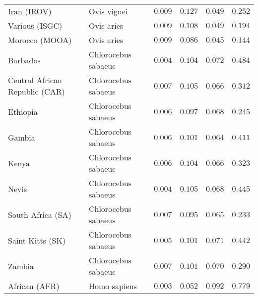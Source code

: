 \documentclass{article}
\begin{document}
\begin{center}
\begin{longtable}{|l|l|r|r|r|r|}
            Iran (IROV)                    & Ovis vignei         & $ 0.009$              & $ 0.127$                & $ 0.049$                 & $ 0.252$                     \\
            Various (ISGC)                 & Ovis aries          & $ 0.009$              & $ 0.108$                & $ 0.049$                 & $ 0.194$                     \\
            Morocco (MOOA)                 & Ovis aries          & $ 0.009$              & $ 0.086$                & $ 0.045$                 & $ 0.144$                     \\
            Barbados                       & Chlorocebus sabaeus & $ 0.004$              & $ 0.104$                & $ 0.072$                 & $ 0.484$                     \\
            Central African Republic (CAR) & Chlorocebus sabaeus & $ 0.007$              & $ 0.105$                & $ 0.066$                 & $ 0.312$                     \\
            Ethiopia                       & Chlorocebus sabaeus & $ 0.006$              & $ 0.097$                & $ 0.068$                 & $ 0.245$                     \\
            Gambia                         & Chlorocebus sabaeus & $ 0.006$              & $ 0.101$                & $ 0.064$                 & $ 0.411$                     \\
            Kenya                          & Chlorocebus sabaeus & $ 0.006$              & $ 0.104$                & $ 0.066$                 & $ 0.323$                     \\
            Nevis                          & Chlorocebus sabaeus & $ 0.004$              & $ 0.105$                & $ 0.068$                 & $ 0.445$                     \\
            South Africa (SA)              & Chlorocebus sabaeus & $ 0.007$              & $ 0.095$                & $ 0.065$                 & $ 0.233$                     \\
            Saint Kitts (SK)               & Chlorocebus sabaeus & $ 0.005$              & $ 0.101$                & $ 0.071$                 & $ 0.442$                     \\
            Zambia                         & Chlorocebus sabaeus & $ 0.007$              & $ 0.101$                & $ 0.070$                 & $ 0.290$                     \\
            African (AFR)                  & Homo sapiens        & $ 0.003$              & $ 0.052$                & $ 0.092$                 & $ 0.779$                     \\

\end{longtable}
\end{center}
\end{document}
